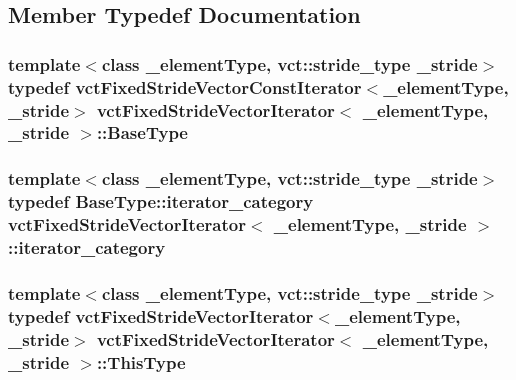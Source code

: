 \subsection{Member Typedef Documentation}
\hypertarget{classvct_fixed_stride_vector_iterator_a3f9c3435364bd43064a82e9b1446f3be}{
\subsubsection[{Base\-Type}]{\setlength{\rightskip}{0pt plus 5cm}template$<$class \-\_\-element\-Type, vct\-::stride\-\_\-type \-\_\-stride$>$ typedef {\bf vct\-Fixed\-Stride\-Vector\-Const\-Iterator}$<$\-\_\-element\-Type, \-\_\-stride$>$ {\bf vct\-Fixed\-Stride\-Vector\-Iterator}$<$ \-\_\-element\-Type, \-\_\-stride $>$\-::{\bf Base\-Type}}}\label{classvct_fixed_stride_vector_iterator_a3f9c3435364bd43064a82e9b1446f3be}
\hypertarget{classvct_fixed_stride_vector_iterator_a2f2031bcd38f41975bc90a9f3b8af46f}{
\subsubsection[{iterator\-\_\-category}]{\setlength{\rightskip}{0pt plus 5cm}template$<$class \-\_\-element\-Type, vct\-::stride\-\_\-type \-\_\-stride$>$ typedef Base\-Type\-::iterator\-\_\-category {\bf vct\-Fixed\-Stride\-Vector\-Iterator}$<$ \-\_\-element\-Type, \-\_\-stride $>$\-::{\bf iterator\-\_\-category}}}\label{classvct_fixed_stride_vector_iterator_a2f2031bcd38f41975bc90a9f3b8af46f}
\hypertarget{classvct_fixed_stride_vector_iterator_a2a515ead5522ffc2eb376b301053d5f2}{
\subsubsection[{This\-Type}]{\setlength{\rightskip}{0pt plus 5cm}template$<$class \-\_\-element\-Type, vct\-::stride\-\_\-type \-\_\-stride$>$ typedef {\bf vct\-Fixed\-Stride\-Vector\-Iterator}$<$\-\_\-element\-Type, \-\_\-stride$>$ {\bf vct\-Fixed\-Stride\-Vector\-Iterator}$<$ \-\_\-element\-Type, \-\_\-stride $>$\-::{\bf This\-Type}}}\label{classvct_fixed_stride_vector_iterator_a2a515ead5522ffc2eb376b301053d5f2}


